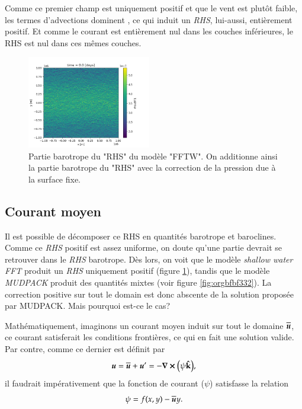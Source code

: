 \documentclass[10pt]{article}
\numberwithin{equation}{section}
\newcommand{\kvf}{\vb{\hat{k}}}
\newcommand{\uu}{\vb*{u}}
\begin{document}
Comme ce premier champ est uniquement positif et que le vent est plutôt faible, les termes d'advections dominent , ce qui induit un \emph{RHS}, lui-aussi, entièrement positif.
Et comme le courant est entièrement nul dans les couches inférieures, le RHS est nul dans ces mêmes couches. \bigskip

\begin{figure} \vspace{-\baselineskip} \centering
\centering
\includegraphics[width=0.48\textwidth]{figures/debuggage/2023_06_12_RHSuBTfftw.png}
\caption{\label{fig:org4ab397e}Partie barotrope du "RHS" du modèle "FFTW". On additionne ainsi la partie barotrope du "RHS" avec la correction de la pression due à la surface fixe.}
\end{figure}

\subsection{Courant moyen}
\label{sec:orgf233f53}

Il est possible de décomposer ce RHS en quantités barotrope et baroclines.
Comme ce \emph{RHS} positif est assez uniforme, on doute qu'une partie devrait se retrouver dans le \emph{RHS} barotrope.
Dès lors, on voit que le modèle \emph{shallow water FFT} produit un \emph{RHS} uniquement positif (figure \ref{fig:org4ab397e}), tandis que le modèle \emph{MUDPACK} produit des quantités mixtes (voir figure \ref{fig:orgbfbf332}).
La correction positive sur tout le domain est donc abscente de la solution proposée par MUDPACK.
Mais pourquoi est-ce le cas?\bigskip

Mathématiquement, imaginons un courant moyen induit sur tout le domaine \(\overline{\uu}\), ce courant satisferait les conditions frontières, ce qui en fait une solution valide.
Par contre, comme ce dernier est définit par
\begin{equation}
   \uu = \overline{\uu} + \uu' = - \curl(\psi\kvf),
\end{equation}
il faudrait impérativement que la fonction de courant (\(\psi\)) satisfasse la relation
\begin{equation}
\label{eq:org84d6c80}
   \psi = f(x,y) - \overline{\uu} y.
\end{equation}
\end{document}
